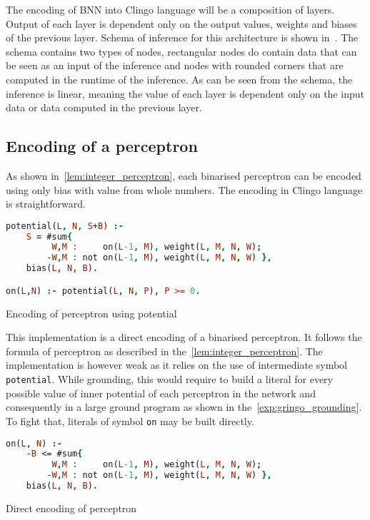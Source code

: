 The encoding of BNN into Clingo language will be a composition of layers.
Output of each layer is dependent only on the output values, weights and biases
of the previous layer. Schema of inference for this architecture is shown
in~. The schema contains two types of nodes,
rectangular nodes do contain data that can be seen as an input of the inference
and nodes with rounded corners that are computed in the runtime of the inference.
As can be seen from the schema, the inference is linear, meaning the value of each
layer is dependent only on the input data or data computed in the previous layer.

\subsection{Encoding of a perceptron}

As shown in~\cref{lem:integer_perceptron}, each binarised perceptron can be encoded
using only bias with value from whole numbers. The encoding in Clingo language is
straightforward.

\begin{code}
\begin{lstlisting}[language=Prolog, numbers=none]
potential(L, N, S+B) :-
    S = #sum{
         W,M :     on(L-1, M), weight(L, M, N, W);
        -W,M : not on(L-1, M), weight(L, M, N, W) },
    bias(L, N, B).

on(L,N) :- potential(L, N, P), P >= 0.
\end{lstlisting}%
    \caption{Encoding of perceptron using potential}\label{enc:perc_potential}
\end{code}

This implementation is a direct encoding of a binarised perceptron.
It follows the formula of perceptron as described in the~\cref{lem:integer_perceptron}.
The implementation is however weak as it relies on the use of intermediate
symbol \texttt{potential}. While grounding, this would require to build a literal
for every possible value of inner potential of each perceptron in the network
and consequently in a large ground program as shown in the~\cref{exp:gringo_grounding}.
To fight that, literals of symbol \texttt{on} may be built directly.\label{sec:perc_potential_removal}

\begin{code}
\begin{lstlisting}[language=Prolog, numbers=none]
on(L, N) :-
    -B <= #sum{
         W,M :     on(L-1, M), weight(L, M, N, W);
        -W,M : not on(L-1, M), weight(L, M, N, W) },
    bias(L, N, B).
\end{lstlisting}
    \caption{Direct encoding of perceptron}\label{enc:perc_direct}
\end{code}

